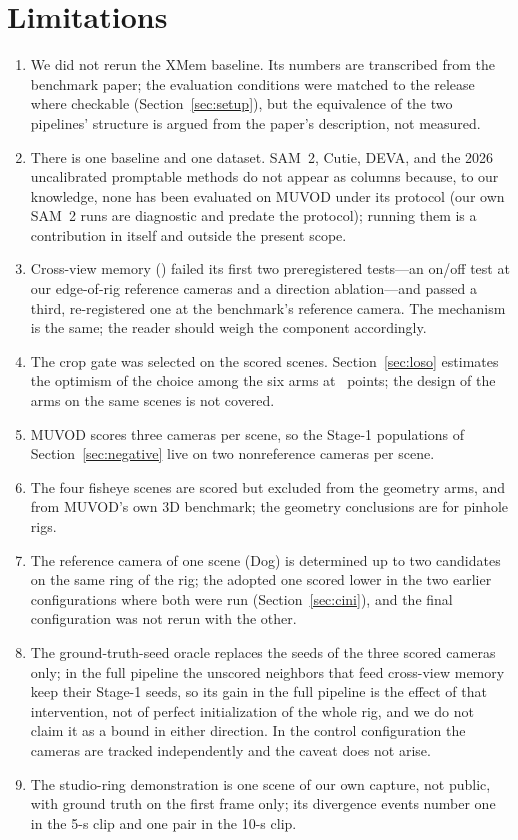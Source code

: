 \documentclass[journal]{IEEEtran}
\begin{document}
\section{Limitations}
\label{sec:limits}
\begin{enumerate}
  \item We did not rerun the XMem baseline. Its numbers are transcribed from
        the benchmark paper; the evaluation conditions were matched to the
        release where checkable (Section~\ref{sec:setup}), but the equivalence
        of the two pipelines' structure is argued from the paper's description,
        not measured.
  \item There is one baseline and one dataset. SAM~2, Cutie, DEVA, and the
        2026 uncalibrated promptable methods do not appear as columns because,
        to our knowledge, none has been evaluated on MUVOD under its protocol
        (our own SAM~2 runs are diagnostic and predate the protocol); running
        them is a contribution in itself and outside the present scope.
  \item Cross-view memory (\gainXview) failed its first two preregistered
        tests---an on/off test at our edge-of-rig reference cameras and a
        direction ablation---and passed a third, re-registered one at the
        benchmark's reference camera. The mechanism is the same; the reader
        should weigh the component accordingly.
  \item The crop gate was selected on the scored scenes. Section~\ref{sec:loso}
        estimates the optimism of the choice among the six arms at \losoOmega\
        points; the design of the arms on the same scenes is not covered.
  \item MUVOD scores three cameras per scene, so the Stage-1 populations of
        Section~\ref{sec:negative} live on two nonreference cameras per scene.
  \item The four fisheye scenes are scored but excluded from the
        geometry arms, and from MUVOD's own 3D benchmark; the geometry
        conclusions are for pinhole rigs.
  \item The reference camera of one scene (Dog) is determined up to two
        candidates on the same ring of the rig; the adopted one scored lower in
        the two earlier configurations where both were run
        (Section~\ref{sec:cini}), and the final configuration was not rerun
        with the other.
  \item The ground-truth-seed oracle replaces the seeds of the three scored
        cameras only; in the full pipeline the unscored neighbors that feed
        cross-view memory keep their Stage-1 seeds, so its gain in the full
        pipeline is the effect of that intervention, not of perfect
        initialization of the whole rig, and we do not claim it as a bound in
        either direction. In the control configuration the cameras are tracked
        independently and the caveat does not arise.
  \item The studio-ring demonstration is one scene of our own capture, not
        public, with ground truth on the first frame only; its divergence
        events number one in the 5-s clip and one pair in the 10-s clip.
\end{enumerate}
\end{document}
